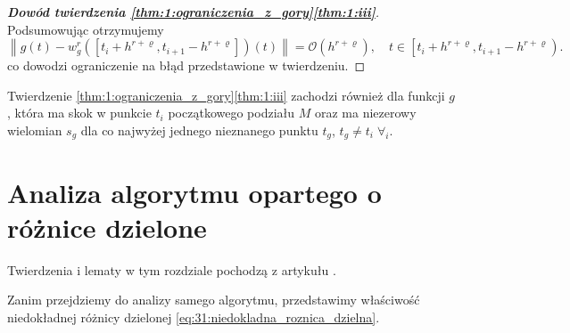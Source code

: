 \documentclass[oik, pdftex, robocza, man]{mgrwms}
\begin{document}
\begin{proof}[\textbf{Dowód twierdzenia \ref{thm:1:ograniczenia_z_gory}\ref{thm:1:iii}}]
        Podsumowując otrzymujemy
        \begin{equation*}
            \left\|g(t)-w_{g}^{r}\left(\left[t_{i}+h^{r+\varrho}, t_{i+1}-h^{r+\varrho}\right]\right)(t)\right\|=\mathcal{O}\left(h^{r+\varrho}\right), \quad t \in\left[t_{i}+h^{r+\varrho}, t_{i+1}-h^{r+\varrho}\right).
        \end{equation*}
        co dowodzi ograniczenie na błąd przedstawione w twierdzeniu.

    \end{proof}

    \begin{uw}
        Twierdzenie \ref{thm:1:ograniczenia_z_gory}\ref{thm:1:iii} zachodzi również dla funkcji $g$, która ma skok w punkcie $t_{i}$ początkowego podziału $M$ oraz ma niezerowy wielomian $s_{g}$ dla co najwyżej jednego nieznanego punktu $t_{g}$, $t_{g} \neq t_{i} \; \forall_{i}$.
    \end{uw}


\section{Analiza algorytmu opartego o różnice dzielone}

    Twierdzenia i lematy w tym rozdziale pochodzą z artykułu \cite{AoP}.

    Zanim przejdziemy do analizy samego algorytmu, przedstawimy właściwość niedokładnej różnicy dzielonej \eqref{eq:31:niedokladna_roznica_dzielna}.
\end{document}
